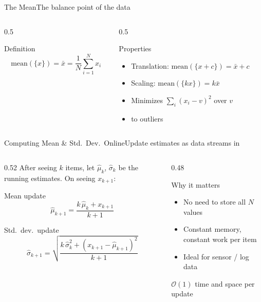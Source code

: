 \documentclass[aspectratio=169,11pt]{beamer}
\begin{document}
\begin{frame}{The Mean}{The balance point of the data}
  \begin{columns}[T]
    \begin{column}{0.5\textwidth}
      \begin{block}{Definition}
        \[ \text{mean}(\{x\}) = \bar{x} = \frac{1}{N}\sum_{i=1}^{N} x_i \]
      \end{block}
    \end{column}
    \begin{column}{0.5\textwidth}
      \begin{exampleblock}{Properties}
        \small
        \begin{itemize}
          \item Translation: $\text{mean}(\{x+c\}) = \bar{x}+c$
          \item Scaling: $\text{mean}(\{kx\}) = k\bar{x}$
          \item Minimizes $\sum_i (x_i - v)^2$ over $v$
          \item {} to outliers
        \end{itemize}
      \end{exampleblock}
    \end{column}
  \end{columns}
\end{frame}

\begin{frame}{Computing Mean \& Std.\ Dev.\ Online}{Update estimates as data streams in}
  \begin{columns}[T]
    \begin{column}{0.52\textwidth}
      After seeing $k$ items, let $\hat\mu_k$, $\hat\sigma_k$ be the running
      estimates. On seeing $x_{k+1}$:
      \begin{block}{Mean update}
        \[ \hat\mu_{k+1} = \frac{k\,\hat\mu_k + x_{k+1}}{k+1} \]
      \end{block}
      \begin{block}{Std.\ dev.\ update}
        \[ \hat\sigma_{k+1} = \sqrt{\frac{k\,\hat\sigma_k^2 + (x_{k+1}-\hat\mu_{k+1})^2}{k+1}} \]
      \end{block}
    \end{column}
    \begin{column}{0.48\textwidth}
      \begin{exampleblock}{Why it matters}
        \small
        \begin{itemize}
          \item No need to store all $N$ values
          \item Constant memory, constant work per item
          \item Ideal for  sensor / log data
        \end{itemize}
      \end{exampleblock}
      \centering\scriptsize $\mathcal{O}(1)$ time and space per update
    \end{column}
  \end{columns}
\end{frame}
\end{document}
